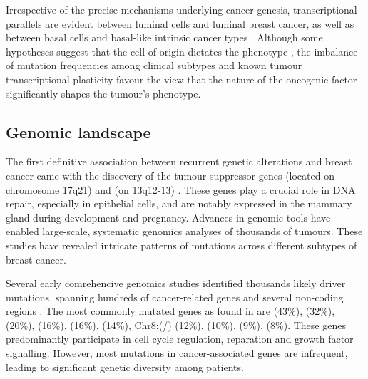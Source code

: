 Irrespective of the precise mechanisms underlying cancer genesis, transcriptional parallels are evident between luminal cells and luminal breast cancer, as well as between basal cells and basal-like intrinsic cancer types \parencite{Bhat-Nakshatri2021-jy}. Although some hypotheses suggest that the cell of origin dictates the phenotype \parencite{Skibinski2015-rh, Taurin2020-mq}, the imbalance of mutation frequencies among clinical subtypes \parencite{Cancer_Genome_Atlas_Network2012-gx,Russnes2017-eo} and known tumour transcriptional plasticity \parencite{Fan2020-vi, Su2015-ve,Yamamoto2014-th,Hein2016-lv} favour the view that the nature of the oncogenic factor significantly shapes the tumour's phenotype.

\subsection{Genomic landscape} 

The first definitive association between recurrent genetic alterations and breast cancer came with the discovery of the tumour suppressor genes  (located on chromosome 17q21) and  (on 13q12-13) \parencite{Wooster1994-xa, Hall1990-mg}. These genes play a crucial role in DNA repair, especially in epithelial cells, and are notably expressed in the mammary gland during development and pregnancy. Advances in genomic tools have enabled large-scale, systematic genomics analyses of thousands of tumours. These studies have revealed intricate patterns of mutations across different subtypes of breast cancer.

Several early comrehencive genomics studies identified thousands likely driver mutations, spanning hundreds of cancer-related genes and several non-coding regions \parencite{Shah2009-xz, Cancer_Genome_Atlas_Network2012-gx,Shah2012-xz, Nik-Zainal2016-ek,Banerji2012-as,Ciriello2015-ey,Pereira2016-ov, Curtis2012-hu}. The most commonly mutated genes as found in \textcite{Cancer_Genome_Atlas_Network2012-gx} are  (43\%),  (32\%),  (20\%),  (16\%),  (16\%),  (14\%), Chr8:(/) (12\%),  (10\%),  (9\%),  (8\%). These genes predominantly participate in cell cycle regulation, reparation and growth factor signalling. However, most mutations in cancer-associated genes are infrequent, leading to significant genetic diversity among patients.

